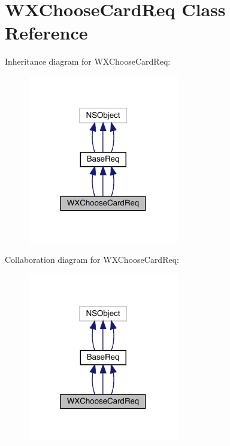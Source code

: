 \hypertarget{interface_w_x_choose_card_req}{}\section{W\+X\+Choose\+Card\+Req Class Reference}
\label{interface_w_x_choose_card_req}


Inheritance diagram for W\+X\+Choose\+Card\+Req\+:\nopagebreak
\begin{figure}[H]
\begin{center}
\leavevmode
\includegraphics[width=187pt]{interface_w_x_choose_card_req__inherit__graph}
\end{center}
\end{figure}


Collaboration diagram for W\+X\+Choose\+Card\+Req\+:\nopagebreak
\begin{figure}[H]
\begin{center}
\leavevmode
\includegraphics[width=187pt]{interface_w_x_choose_card_req__coll__graph}
\end{center}
\end{figure}
